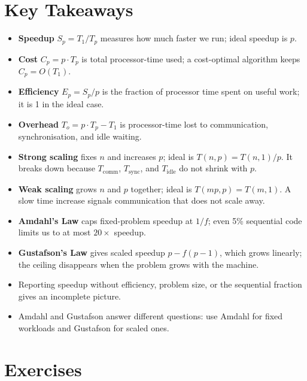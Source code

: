 \section*{Key Takeaways}

\begin{ppnote}
\begin{itemize}
  \item \textbf{Speedup} $S_p = T_1/T_p$ measures how much faster we
        run; ideal speedup is $p$.
  \item \textbf{Cost} $C_p = p \cdot T_p$ is total processor-time used;
        a cost-optimal algorithm keeps $C_p = O(T_1)$.
  \item \textbf{Efficiency} $E_p = S_p/p$ is the fraction of processor
        time spent on useful work; it is 1 in the ideal case.
  \item \textbf{Overhead} $T_o = p \cdot T_p - T_1$ is processor-time
        lost to communication, synchronisation, and idle waiting.
  \item \textbf{Strong scaling} fixes $n$ and increases $p$; ideal is
        $T(n,p) = T(n,1)/p$.  It breaks down because $T_{\mathrm{comm}}$,
        $T_{\mathrm{sync}}$, and $T_{\mathrm{idle}}$ do not shrink
        with $p$.
  \item \textbf{Weak scaling} grows $n$ and $p$ together; ideal is
        $T(mp,p) = T(m,1)$.  A slow time increase signals communication
        that does not scale away.
  \item \textbf{Amdahl's Law} caps fixed-problem speedup at $1/f$; even
        5\% sequential code limits us to at most $20\times$ speedup.
  \item \textbf{Gustafson's Law} gives scaled speedup $p - f(p-1)$,
        which grows linearly; the ceiling disappears when the problem
        grows with the machine.
  \item Reporting speedup without efficiency, problem size, or the
        sequential fraction gives an incomplete picture.
  \item Amdahl and Gustafson answer different questions: use Amdahl for
        fixed workloads and Gustafson for scaled ones.
\end{itemize}
\end{ppnote}

\section{Exercises}

